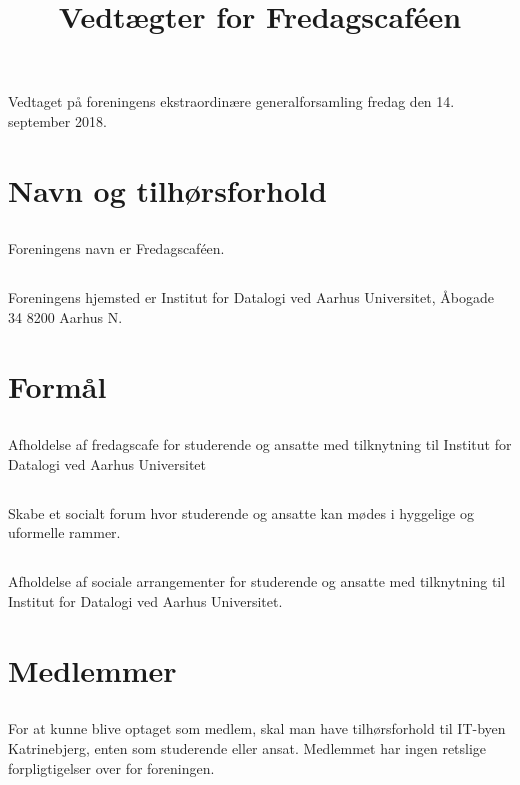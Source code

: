 \documentclass[danish,a4paper,twocolumn,oneside,article]{memoir}
\title{Vedtægter for Fredagscaféen}
\author{}
\date{}
\begin{document}
\maketitle
\newpage

Vedtaget på foreningens ekstraordinære generalforsamling fredag den 14. september 2018.

\chapter{Navn og tilhørsforhold}

\section{} Foreningens navn er Fredagscaféen.

\section{} Foreningens hjemsted er Institut for Datalogi ved Aarhus Universitet, Åbogade 34 8200 Aarhus N.

\chapter{Formål}

\section{} Afholdelse af fredagscafe for studerende og ansatte med tilknytning til Institut for Datalogi
ved Aarhus Universitet

\section{} Skabe et socialt forum hvor studerende og ansatte kan mødes i hyggelige og uformelle rammer.

\section{} Afholdelse af sociale arrangementer for studerende og ansatte med tilknytning til Institut for Datalogi
ved Aarhus Universitet.


\chapter{Medlemmer}

\section{} For at kunne blive optaget som medlem, skal man have tilhørsforhold til IT-byen Katrinebjerg,
enten som studerende eller ansat. Medlemmet har ingen retslige forpligtigelser over for foreningen.
\end{document}
